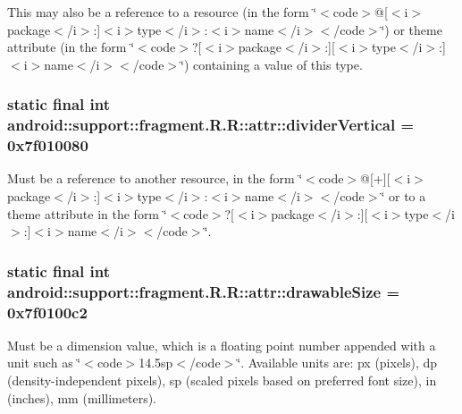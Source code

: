 This may also be a reference to a resource (in the form \char`\"{}$<$code$>$@\mbox{[}$<$i$>$package$<$/i$>$:\mbox{]}$<$i$>$type$<$/i$>$:$<$i$>$name$<$/i$>$$<$/code$>$\char`\"{}) or theme attribute (in the form \char`\"{}$<$code$>$?\mbox{[}$<$i$>$package$<$/i$>$:\mbox{]}\mbox{[}$<$i$>$type$<$/i$>$:\mbox{]}$<$i$>$name$<$/i$>$$<$/code$>$\char`\"{}) containing a value of this type. \hypertarget{classandroid_1_1support_1_1fragment_1_1_r_1_1attr_d274f31ba24a6d19b9a8c95f3a223900}{
\subsubsection[{dividerVertical}]{\setlength{\rightskip}{0pt plus 5cm}static final int android::support::fragment.R.R::attr::dividerVertical = 0x7f010080}}
\label{classandroid_1_1support_1_1fragment_1_1_r_1_1attr_d274f31ba24a6d19b9a8c95f3a223900}


Must be a reference to another resource, in the form \char`\"{}$<$code$>$@\mbox{[}+\mbox{]}\mbox{[}$<$i$>$package$<$/i$>$:\mbox{]}$<$i$>$type$<$/i$>$:$<$i$>$name$<$/i$>$$<$/code$>$\char`\"{} or to a theme attribute in the form \char`\"{}$<$code$>$?\mbox{[}$<$i$>$package$<$/i$>$:\mbox{]}\mbox{[}$<$i$>$type$<$/i$>$:\mbox{]}$<$i$>$name$<$/i$>$$<$/code$>$\char`\"{}. \hypertarget{classandroid_1_1support_1_1fragment_1_1_r_1_1attr_0012245bfc800d4ac6ea43e979e1704c}{
\subsubsection[{drawableSize}]{\setlength{\rightskip}{0pt plus 5cm}static final int android::support::fragment.R.R::attr::drawableSize = 0x7f0100c2}}
\label{classandroid_1_1support_1_1fragment_1_1_r_1_1attr_0012245bfc800d4ac6ea43e979e1704c}


Must be a dimension value, which is a floating point number appended with a unit such as \char`\"{}$<$code$>$14.5sp$<$/code$>$\char`\"{}. Available units are: px (pixels), dp (density-independent pixels), sp (scaled pixels based on preferred font size), in (inches), mm (millimeters). 

